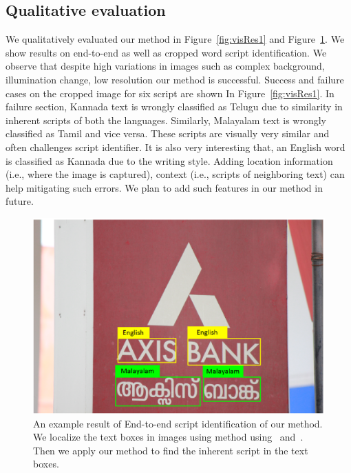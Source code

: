 \subsection{Qualitative evaluation}
We qualitatively evaluated our method in Figure~\ref{fig:visRes1} and Figure~\ref{fig:visRes2}. We show results on end-to-end as well as cropped word
script identification. We observe that despite high variations in images such as complex background, illumination change, low resolution our method is successful. Success and failure cases on the cropped image for six script are shown In Figure~\ref{fig:visRes1}. In failure section, Kannada text is wrongly classified as Telugu due to similarity in inherent scripts of both the languages. Similarly, Malayalam text is wrongly classified as Tamil and vice versa. These scripts are visually very similar and often challenges script identifier. It is also very interesting that, an English word is classified as Kannada due to the writing style. Adding location information (i.e., where the image is captured), context (i.e., scripts of neighboring text) can help mitigating such errors. We plan to add such features in our method in future.
\begin{figure}[t!]
\centering
  \includegraphics[scale=0.5]{figures/endtoend.eps}
  \caption{An example result of End-to-end script identification of our method. We localize the text boxes in images using method using~\cite{GomezK14} and~\cite{tessOCR}. Then we apply our method to find the inherent script in the text boxes.}
  \label{fig:visRes2}
\end{figure}
